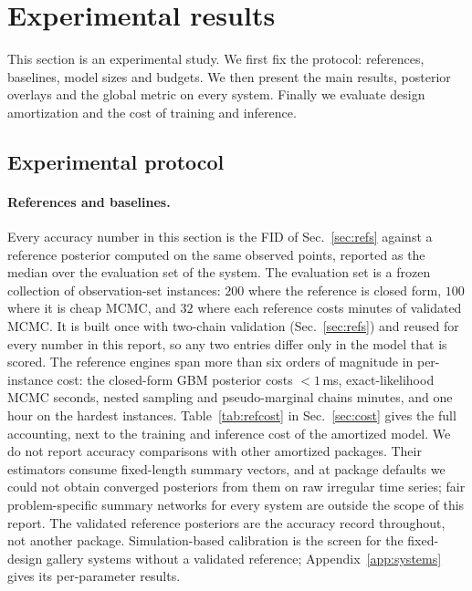 \documentclass[10pt]{article}
\begin{document}
\section{Experimental results}
\label{sec:results}

This section is an experimental study. We first fix the protocol: references, baselines, model sizes
and budgets. We then present the main results, posterior overlays and the global metric on every
system. Finally we evaluate design amortization and the cost of training and inference.

\subsection{Experimental protocol}
\label{sec:protocol-exp}

\paragraph{References and baselines.} Every accuracy number in this section is the FID of
Sec.~\ref{sec:refs} against a reference posterior computed on the same observed points, reported as
the median over the evaluation set of the system. The evaluation set is a frozen collection of
observation-set instances: $200$ where the reference is closed form, $100$ where it is cheap MCMC, and
$32$ where each reference costs minutes of validated MCMC. It is built once with two-chain validation
(Sec.~\ref{sec:refs}) and reused for every number in this report, so any two entries differ only in
the model that is scored. The reference engines span more than six orders of magnitude in
per-instance cost: the closed-form GBM posterior costs ${<}1$\,ms, exact-likelihood MCMC seconds,
nested sampling and pseudo-marginal chains minutes, and one hour on the hardest instances.
Table~\ref{tab:refcost} in Sec.~\ref{sec:cost} gives the full accounting, next to the training and
inference cost of the amortized model. We do not report accuracy comparisons with other amortized
packages. Their estimators consume fixed-length summary vectors, and at package defaults we could not
obtain converged posteriors from them on raw irregular time series; fair problem-specific summary
networks for every system are outside the scope of this report. The validated reference posteriors
are the accuracy record throughout, not another package. Simulation-based calibration is the screen
for the fixed-design gallery systems without a validated reference; Appendix~\ref{app:systems} gives
its per-parameter results.
\end{document}
